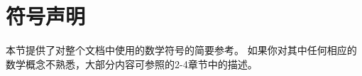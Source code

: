 \chapter*{符号声明}
\label{notation}



本节提供了对整个文档中使用的数学符号的简要参考。
如果你对其中任何相应的数学概念不熟悉，大部分内容可参照\citet{dlbook}的2-4章节中的描述。

